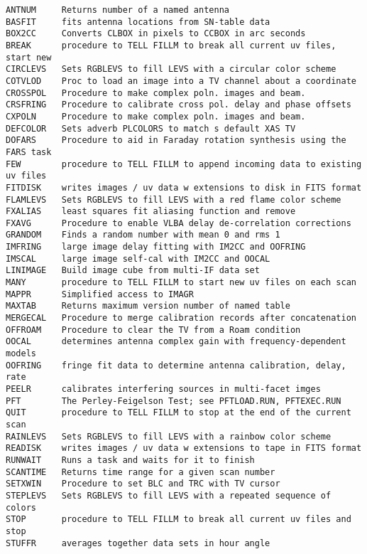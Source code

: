 
\vskip 0.5pt
\bbve\begin{verbatim}
ANTNUM     Returns number of a named antenna
BASFIT     fits antenna locations from SN-table data
BOX2CC     Converts CLBOX in pixels to CCBOX in arc seconds
BREAK      procedure to TELL FILLM to break all current uv files, start new
CIRCLEVS   Sets RGBLEVS to fill LEVS with a circular color scheme
COTVLOD    Proc to load an image into a TV channel about a coordinate
CROSSPOL   Procedure to make complex poln. images and beam.
CRSFRING   Procedure to calibrate cross pol. delay and phase offsets
CXPOLN     Procedure to make complex poln. images and beam.
DEFCOLOR   Sets adverb PLCOLORS to match s default XAS TV
DOFARS     Procedure to aid in Faraday rotation synthesis using the FARS task
FEW        procedure to TELL FILLM to append incoming data to existing uv files
FITDISK    writes images / uv data w extensions to disk in FITS format
FLAMLEVS   Sets RGBLEVS to fill LEVS with a red flame color scheme
FXALIAS    least squares fit aliasing function and remove
FXAVG      Procedure to enable VLBA delay de-correlation corrections
GRANDOM    Finds a random number with mean 0 and rms 1
IMFRING    large image delay fitting with IM2CC and OOFRING
IMSCAL     large image self-cal with IM2CC and OOCAL
LINIMAGE   Build image cube from multi-IF data set
MANY       procedure to TELL FILLM to start new uv files on each scan
MAPPR      Simplified access to IMAGR
MAXTAB     Returns maximum version number of named table
MERGECAL   Procedure to merge calibration records after concatenation
OFFROAM    Procedure to clear the TV from a Roam condition
OOCAL      determines antenna complex gain with frequency-dependent models
OOFRING    fringe fit data to determine antenna calibration, delay, rate
PEELR      calibrates interfering sources in multi-facet imges
PFT        The Perley-Feigelson Test; see PFTLOAD.RUN, PFTEXEC.RUN
QUIT       procedure to TELL FILLM to stop at the end of the current scan
RAINLEVS   Sets RGBLEVS to fill LEVS with a rainbow color scheme
READISK    writes images / uv data w extensions to tape in FITS format
RUNWAIT    Runs a task and waits for it to finish
SCANTIME   Returns time range for a given scan number
SETXWIN    Procedure to set BLC and TRC with TV cursor
STEPLEVS   Sets RGBLEVS to fill LEVS with a repeated sequence of colors
STOP       procedure to TELL FILLM to break all current uv files and stop
STUFFR     averages together data sets in hour angle

\end{verbatim}
